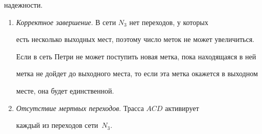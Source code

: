 надежности.

  \begin{enumerate}[1.]

  \item \textit{Корректное завершение}. В сети $N_3$ нет переходов, у которых 

есть несколько выходных мест, поэтому число меток не может увеличиться. 

Если в сеть Петри не может поступить новая метка, пока находящаяся в ней 

метка не дойдет до выходного места, то если эта метка окажется в выходном 

месте, она будет единственной.

\item \textit{Отсутствие мертвых переходов}. Трасса $ACD$ активирует 

каждый из переходов сети~$N_3$.

\end{enumerate}



